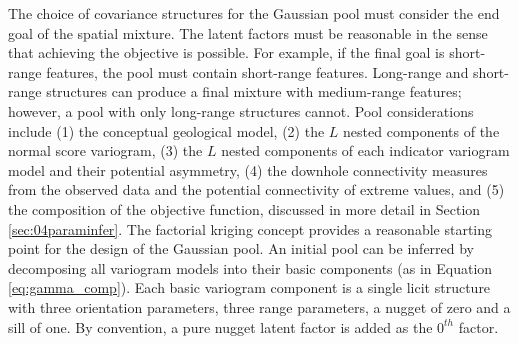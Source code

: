 The choice of covariance structures for the Gaussian pool must consider the end goal of the spatial mixture. The latent factors must be reasonable in the sense that achieving the objective is possible. For example, if the final goal is short-range features, the pool must contain short-range features. Long-range and short-range structures can produce a final mixture with medium-range features; however, a pool with only long-range structures cannot. Pool considerations include (1) the conceptual geological model, (2) the $L$ nested components of the normal score variogram, (3) the $L$ nested components of each indicator variogram model and their potential asymmetry, (4) the downhole connectivity measures from the observed data and the potential connectivity of extreme values, and (5) the composition of the objective function, discussed in more detail in Section \ref{sec:04paraminfer}. The factorial kriging concept provides a reasonable starting point for the design of the Gaussian pool. An initial pool can be inferred by decomposing all variogram models into their basic components (as in Equation \ref{eq:gamma_comp}). Each basic variogram component is a single licit structure with three orientation parameters, three range parameters, a nugget of zero and a sill of one. By convention, a pure nugget latent factor is added as the $0^{th}$ factor.

